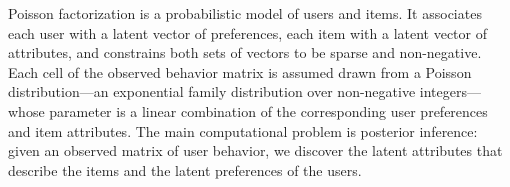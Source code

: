 




Poisson factorization is a probabilistic model of
users and items.  It associates each user with a latent vector of
preferences, each item with a latent vector of attributes, and
constrains both sets of vectors to be sparse and non-negative.  Each
cell of the observed behavior matrix is assumed drawn from a Poisson
distribution---an exponential family distribution over non-negative
integers---whose parameter is a linear combination of the
corresponding user preferences and item attributes.  The main
computational problem is posterior inference: given an observed matrix
of user behavior, we discover the latent attributes that describe the
items and the latent preferences of the users. 

